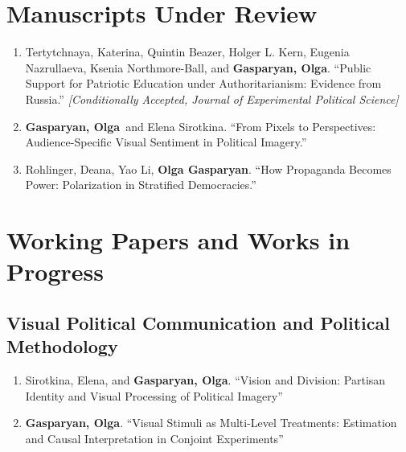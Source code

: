 \documentclass[10pt]{article}
\newcommand{\me}{\textbf{Gasparyan, Olga}}
\newcommand{\status}[1]{ {\small\textit{[#1]}}}
\begin{document}
\section{Manuscripts Under Review}
\begin{enumerate}
    \item Tertytchnaya, Katerina, Quintin Beazer, Holger L. Kern, Eugenia Nazrullaeva, Ksenia Northmore-Ball, and \me. ``Public Support for Patriotic Education under Authoritarianism: Evidence from Russia.'' \status{Conditionally Accepted, \textit{Journal of Experimental Political Science}}
    \item \me\ and Elena Sirotkina. ``From Pixels to Perspectives: Audience-Specific Visual Sentiment in Political Imagery.'' 
    \item Rohlinger, Deana, Yao Li, \textbf{Olga Gasparyan}. ``How Propaganda Becomes Power: Polarization in Stratified Democracies.''
\end{enumerate}

\section{Working Papers and Works in Progress}

\subsection{Visual Political Communication and Political Methodology}
\begin{enumerate}

    \item Sirotkina, Elena, and \me. ``Vision and Division: Partisan Identity and Visual Processing of Political Imagery'' 


    \item \me. ``Visual Stimuli as Multi-Level Treatments: Estimation and Causal Interpretation in Conjoint Experiments''
\end{enumerate}
\end{document}
